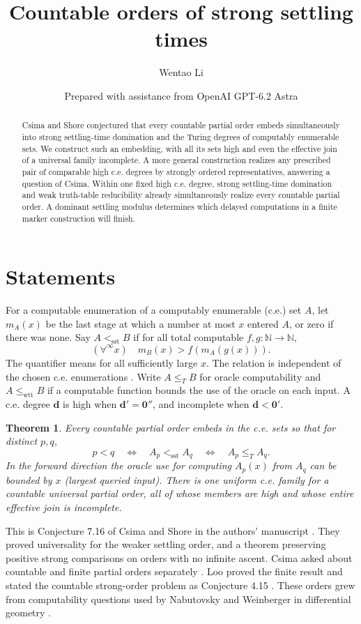 \documentclass[11pt]{article}
\title{Countable orders of strong settling times}
\author{Wentao Li}
\date{\small Prepared with assistance from OpenAI GPT-6.2 Astra}
\newtheorem{theorem}{Theorem}
\newcommand{\NN}{\mathbb N}
\newcommand{\sst}{\mathrm{sst}}
\newcommand{\wtt}{\mathrm{wtt}}
\begin{document}
\maketitle
\begin{abstract}
Csima and Shore conjectured that every countable partial order embeds simultaneously into strong settling-time domination and the Turing degrees of computably enumerable sets. We construct such an embedding, with all its sets high and even the effective join of a universal family incomplete. A more general construction realizes any prescribed pair of comparable high c.e. degrees by strongly ordered representatives, answering a question of Csima. Within one fixed high c.e. degree, strong settling-time domination and weak truth-table reducibility already simultaneously realize every countable partial order. A dominant settling modulus determines which delayed computations in a finite marker construction will finish.
\end{abstract}

\section{Statements}
For a computable enumeration of a computably enumerable (c.e.) set $A$, let $m_A(x)$ be the last stage at which a number at most $x$ entered $A$, or zero if there was none. Say $A<_{\sst} B$ if for all total computable $f,g:\NN\to\NN$,
\[
                 (\forall^{\infty} x)\quad m_B(x)> f(m_A(g(x))).
\]
The quantifier means for all sufficiently large $x$. The relation is independent of the chosen c.e. enumerations \cite{cs,soare}. Write $A\le_T B$ for oracle computability and $A\le_{\wtt}B$ if a computable function bounds the use of the oracle on each input. A c.e. degree $\mathbf d$ is high when $\mathbf d'=\mathbf 0''$, and incomplete when $\mathbf d<\mathbf 0'$.

\begin{theorem}\label{main}
Every countable partial order embeds in the c.e. sets so that for distinct $p,q$,
\[
       p<q\quad\Longleftrightarrow\quad A_p<_{\sst}A_q
       \quad\Longleftrightarrow\quad A_p\le_T A_q .
\]
In the forward direction the oracle use for computing $A_p(x)$ from $A_q$ can be bounded by $x$ (largest queried input). There is one uniform c.e. family for a countable universal partial order, all of whose members are high and whose entire effective join is incomplete.
\end{theorem}

This is Conjecture 7.16 of Csima and Shore in the authors' manuscript \cite{cs}. They proved universality for the weaker settling order, and a theorem preserving positive strong comparisons on orders with no infinite ascent. Csima asked about countable and finite partial orders separately \cite[Questions 1--3]{survey}. Loo proved the finite result and stated the countable strong-order problem as Conjecture 4.15 \cite{loo}. These orders grew from computability questions used by Nabutovsky and Weinberger in differential geometry \cite{soare}.
\end{document}
